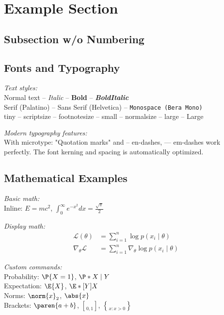 \section{Example Section}

\subsection*{Subsection w/o Numbering}

\subsection{Fonts and Typography}

\emph{Text styles:}\\
Normal text -- 
\textit{Italic} -- 
\textbf{Bold} -- 
\textbf{\textit{BoldItalic}}
\\
\textrm{Serif (Palatino)} -- 
\textsf{Sans Serif (Helvetica)} -- 
\texttt{Monospace (Bera Mono)}
\\
{\tiny tiny} --
{\scriptsize scriptsize} --
{\footnotesize footnotesize} --
{\small small} --
{\normalsize normalsize} --
{\large large} --
{\Large Large}

\emph{Modern typography features:}\\
With microtype: "Quotation marks" and -- en-dashes, --- em-dashes work perfectly.
The font kerning and spacing is automatically optimized.

\subsection{Mathematical Examples}

\emph{Basic math:}\\
Inline: $E = mc^2$, $\int_0^\infty e^{-x^2} dx = \frac{\sqrt{\pi}}{2}$

\emph{Display math:}
\begin{align}
    \mathcal{L}(\theta) &= \sum_{i=1}^n \log p(x_i \mid \theta) \\
    \nabla_\theta \mathcal{L} &= \sum_{i=1}^n \nabla_\theta \log p(x_i \mid \theta)
\end{align}

\emph{Custom commands:}\\
Probability: $\P{X = 1}$, $\P*{X \mid Y}$\\
Expectation: $\E{X}$, $\E*[Y]{X}$\\
Norms: $\norm{x}_2$, $\abs{x}$\\
Brackets: $\paren{a + b}$, $\brack{0, 1}$, $\brace{x : x > 0}$

